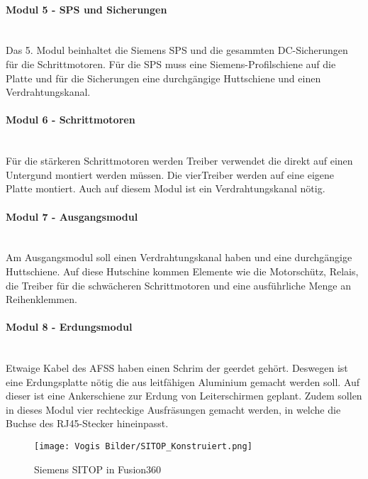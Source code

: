     \paragraph{Modul 5 - SPS und Sicherungen}\mbox{}\\
    Das 5. Modul beinhaltet die Siemens SPS und die gesammten DC-Sicherungen für die Schrittmotoren. Für die SPS muss eine Siemens-Profilschiene auf die Platte und für die Sicherungen eine durchgängige Huttschiene und einen Verdrahtungskanal.
    \paragraph{Modul 6 - Schrittmotoren}\mbox{}\\
    Für die stärkeren Schrittmotoren werden Treiber verwendet die direkt auf einen Untergund montiert werden müssen. Die vierTreiber werden auf eine eigene Platte montiert. Auch auf diesem Modul ist ein Verdrahtungskanal nötig.
    \paragraph{Modul 7 - Ausgangsmodul}\mbox{}\\
    Am Ausgangsmodul soll einen Verdrahtungskanal haben und eine durchgängige Huttschiene. Auf diese Hutschine kommen Elemente wie die Motorschütz, Relais, die Treiber für die schwächeren Schrittmotoren und eine ausführliche Menge an Reihenklemmen.
    \paragraph{Modul 8 - Erdungsmodul}\mbox{}\\
    Etwaige Kabel des AFSS haben einen Schrim der geerdet gehört. Deswegen ist eine Erdungsplatte nötig die aus leitfähigen Aluminium gemacht werden soll. Auf dieser ist eine Ankerschiene zur Erdung von Leiterschirmen geplant. Zudem sollen in dieses Modul vier rechteckige Ausfräsungen gemacht werden, in welche die Buchse des RJ45-Stecker hineinpasst.
    \begin{wrapfigure}{r}{0.3\textwidth}
        \vspace{0px}
        \texttt{[image: Vogis Bilder/SITOP\_Konstruiert.png]}
        \caption{Siemens SITOP in Fusion360}
        \vspace{-30px}
        \label{fig:SITOP_Konstrueiert}
    \end{wrapfigure}

